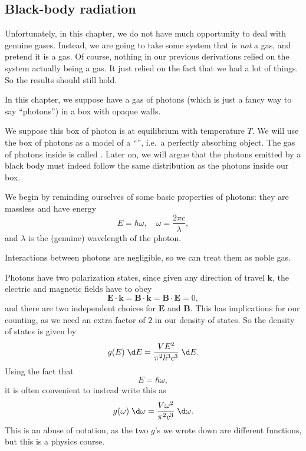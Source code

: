 \documentclass[a4paper]{article}
\begin{document}
\subsection{Black-body radiation}
Unfortunately, in this chapter, we do not have much opportunity to deal with genuine gases. Instead, we are going to take some system that is \emph{not} a gas, and pretend it is a gas. Of course, nothing in our previous derivations relied on the system actually being a gas. It just relied on the fact that we had a lot of things. So the results should still hold.

In this chapter, we suppose have a gas of photons (which is just a fancy way to say ``photons'') in a box with opaque walls.
\begin{center}
\end{center}
We suppose this box of photon is at equilibrium with temperature $T$. We will use the box of photons as a model of a ``'', i.e.\ a perfectly absorbing object. The gas of photons inside is called .
 Later on, we will argue that the photons emitted by a black body must indeed follow the same distribution as the photons inside our box.

We begin by reminding ourselves of some basic properties of photons: they are massless and have energy
\[
  E = \hbar \omega,\quad \omega = \frac{2\pi c}{\lambda},
\]
and $\lambda$ is the (genuine) wavelength of the photon.

Interactions between photons are negligible, so we can treat them as noble gas.

Photons have two polarization states, since given any direction of travel $\mathbf{k}$, the electric and magnetic fields have to obey
\[
  \mathbf{E} \cdot \mathbf{k} = \mathbf{B} \cdot \mathbf{k} = \mathbf{B} \cdot \mathbf{E} = 0,
\]
and there are two independent choices for $\mathbf{E}$ and $\mathbf{B}$. This has implications for our counting, as we need an extra factor of $2$ in our density of states. So the density of states is given by
\[
  g(E) \;\d E = \frac{VE^2}{\pi^2 \hbar^3 c^3}\;\d E.
\]
Using the fact that
\[
  E = \hbar \omega,
\]
it is often convenient to instead write this as
\[
  g(\omega)\; \d \omega = \frac{V \omega^2}{\pi^2 c^3}\;\d \omega.
\]
This is an abuse of notation, as the two $g$'s we wrote down are different functions, but this is a physics course.
\end{document}
